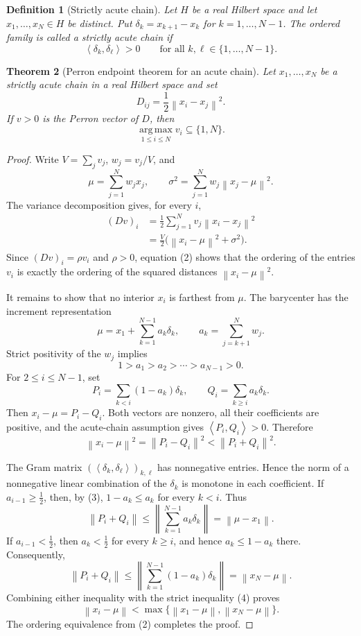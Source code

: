 \documentclass[11pt,a4paper]{article}
\theoremstyle{clean}
\newtheorem{definition}{Definition}[section]
\newtheorem{theorem}[definition]{Theorem}
\theoremstyle{remark}
\newcommand{\ip}[2]{\left\langle #1,#2\right\rangle}
\newcommand{\norm}[1]{\left\lVert #1\right\rVert}
\newcommand{\argmax}{\operatorname*{arg\,max}}
\begin{document}
\begin{definition}[Strictly acute chain]
Let $H$ be a real Hilbert space and let $x_1,\ldots,x_N\in H$ be distinct.  Put
$\delta_k=x_{k+1}-x_k$ for $k=1,\ldots,N-1$.  The ordered family is called a
strictly acute chain if
\[
  \ip{\delta_k}{\delta_\ell}>0
  \qquad\text{for all }k,\ell\in\{1,\ldots,N-1\}.
\]
\end{definition}

\begin{theorem}[Perron endpoint theorem for an acute chain]
\label{thm:acute}
Let $x_1,\ldots,x_N$ be a strictly acute chain in a real Hilbert space and set
\[
  D_{ij}=\frac12\norm{x_i-x_j}^2.
\]
If $v>0$ is the Perron vector of $D$, then
\[
  \argmax_{1\leq i\leq N}v_i\subseteq\{1,N\}.
\]
\end{theorem}

\begin{proof}
Write $V=\sum_jv_j$, $w_j=v_j/V$, and
\[
  \mu=\sum_{j=1}^Nw_jx_j,
  \qquad
  \sigma^2=\sum_{j=1}^Nw_j\norm{x_j-\mu}^2.
\]
The variance decomposition gives, for every $i$,
\begin{align*}
  (Dv)_i
  &=\frac12\sum_{j=1}^Nv_j\norm{x_i-x_j}^2\\
  &=\frac{V}{2}\bigl(\norm{x_i-\mu}^2+\sigma^2\bigr).
                                                        \tag{2}
\end{align*}
Since $(Dv)_i=\rho v_i$ and $\rho>0$, equation (2) shows that the ordering of
the entries $v_i$ is exactly the ordering of the squared distances
$\norm{x_i-\mu}^2$.

It remains to show that no interior $x_i$ is farthest from $\mu$.  The
barycenter has the increment representation
\[
  \mu=x_1+\sum_{k=1}^{N-1}a_k\delta_k,
  \qquad
  a_k=\sum_{j=k+1}^Nw_j.
\]
Strict positivity of the $w_j$ implies
\[
  1>a_1>a_2>\cdots>a_{N-1}>0.                 \tag{3}
\]
For $2\leq i\leq N-1$, set
\[
  P_i=\sum_{k<i}(1-a_k)\delta_k,
  \qquad
  Q_i=\sum_{k\geq i}a_k\delta_k.
\]
Then $x_i-\mu=P_i-Q_i$.  Both vectors are nonzero, all their coefficients are
positive, and the acute-chain assumption gives $\ip{P_i}{Q_i}>0$.  Therefore
\[
  \norm{x_i-\mu}^2
  =\norm{P_i-Q_i}^2
  <\norm{P_i+Q_i}^2.                           \tag{4}
\]

The Gram matrix $(\ip{\delta_k}{\delta_\ell})_{k,\ell}$ has nonnegative
entries.  Hence the norm of a nonnegative linear combination of the
$\delta_k$ is monotone in each coefficient.  If $a_{i-1}\geq\tfrac12$, then,
by (3), $1-a_k\leq a_k$ for every $k<i$.  Thus
\[
  \norm{P_i+Q_i}
  \leq\norm{\sum_{k=1}^{N-1}a_k\delta_k}
  =\norm{\mu-x_1}.
\]
If $a_{i-1}<\tfrac12$, then $a_k<\tfrac12$ for every $k\geq i$, and hence
$a_k\leq1-a_k$ there.  Consequently,
\[
  \norm{P_i+Q_i}
  \leq\norm{\sum_{k=1}^{N-1}(1-a_k)\delta_k}
  =\norm{x_N-\mu}.
\]
Combining either inequality with the strict inequality (4) proves
\[
  \norm{x_i-\mu}
  <\max\{\norm{x_1-\mu},\norm{x_N-\mu}\}.
\]
The ordering equivalence from (2) completes the proof.
\end{proof}
\end{document}

